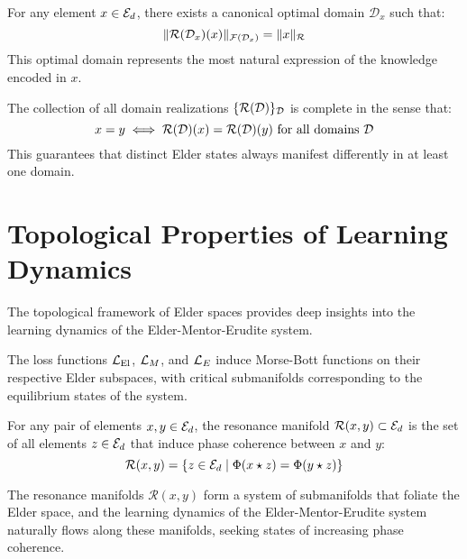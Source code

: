 \begin{theorem}
For any element $x \in \mathcal{E}_{d}$, there exists a canonical optimal domain $\mathcal{D}_x$ such that:
\begin{equation}
\|\mathcal{R}(\mathcal{D}_x)(x)\|_{\mathcal{F}(\mathcal{D}_x)} = \|x\|_{\mathcal{R}}
\end{equation}
This optimal domain represents the most natural expression of the knowledge encoded in $x$.
\end{theorem}

\begin{theorem}
The collection of all domain realizations $\{\mathcal{R}(\mathcal{D})\}_{\mathcal{D}}$ is complete in the sense that:
\begin{equation}
x = y \iff \mathcal{R}(\mathcal{D})(x) = \mathcal{R}(\mathcal{D})(y) \text{ for all domains } \mathcal{D}
\end{equation}
This guarantees that distinct Elder states always manifest differently in at least one domain.
\end{theorem}

\section{Topological Properties of Learning Dynamics}

The topological framework of Elder spaces provides deep insights into the learning dynamics of the Elder-Mentor-Erudite system.

\begin{theorem}
The loss functions $\mathcal{L}_{\text{El}}$, $\mathcal{L}_M$, and $\mathcal{L}_E$ induce Morse-Bott functions on their respective Elder subspaces, with critical submanifolds corresponding to the equilibrium states of the system.
\end{theorem}

\begin{definition}
For any pair of elements $x, y \in \mathcal{E}_{d}$, the resonance manifold $\mathcal{R}(x, y) \subset \mathcal{E}_{d}$ is the set of all elements $z \in \mathcal{E}_{d}$ that induce phase coherence between $x$ and $y$:
\begin{equation}
\mathcal{R}(x, y) = \{z \in \mathcal{E}_{d} \mid \Phi(x \star z) = \Phi(y \star z)\}
\end{equation}
\end{definition}

\begin{theorem}
The resonance manifolds $\mathcal{R}(x, y)$ form a system of submanifolds that foliate the Elder space, and the learning dynamics of the Elder-Mentor-Erudite system naturally flows along these manifolds, seeking states of increasing phase coherence.
\end{theorem}

